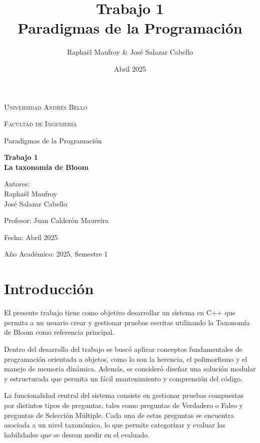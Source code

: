 \documentclass[12pt]{article}
\title{Trabajo 1\\ Paradigmas de la Programaci\'on}
\author{Rapha\"el Maufroy \& Jos\'e Salazar Cabello}
\date{Abril 2025}
\begin{document}
\begin{titlepage}
    \centering
    \vspace*{2cm}
    {\scshape\LARGE Universidad Andr\'es Bello \par}
    \vspace{1cm}
    {\scshape\Large Facultad de Ingenier\'ia\par}
    \vspace{1.5cm}
    {\Large Paradigmas de la Programaci\'on\par}
    \vspace{0.5cm}
    {\huge\bfseries Trabajo 1\\La taxonom\'ia de Bloom \par}
    \vspace{2cm}
    {\Large Autores: \\Rapha\"el Maufroy\\Jos\'e Salazar Cabello\par}
    \vspace{0.5cm}
    {\Large Profesor: Juan Calder\'on Maureira\par}
    \vspace{0.5cm}
    {\Large Fecha: Abril 2025\par}
    \vfill
    {\large A\~no Acad\'emico: 2025, Semestre 1\par}
\end{titlepage}

\section{Introducci\'on}
El presente trabajo tiene como objetivo desarrollar un sistema en C++ que permita a un usuario crear y gestionar pruebas escritas utilizando la Taxonom\'ia de Bloom como referencia principal.

Dentro del desarrollo del trabajo se busc\'o aplicar conceptos fundamentales de programaci\'on orientada a objetos, como lo son la herencia, el polimorfismo y el manejo de memoria din\'amica. Adem\'as, se consider\'o dise\~nar una soluci\'on modular y estructurada que permita un f\'acil mantenimiento y comprensi\'on del c\'odigo.

La funcionalidad central del sistema consiste en gestionar pruebas compuestas por distintos tipos de preguntas, tales como preguntas de Verdadero o Falso y preguntas de Selecci\'on M\'ultiple. Cada una de estas preguntas se encuentra asociada a un nivel taxon\'omico, lo que permite categorizar y evaluar las habilidades que se desean medir en el evaluado.
\end{document}
